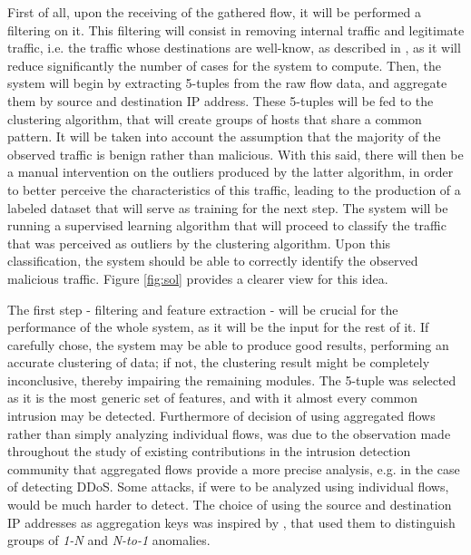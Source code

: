 \documentclass[runningheads,a4paper]{llncs}
\begin{document}
First of all, upon the receiving of the gathered flow, it will be performed a filtering on it. This filtering will consist in removing internal traffic and legitimate traffic, i.e. the traffic whose destinations are well-know, as described in \cite{Zeng2010}, as it will reduce significantly the number of cases for the system to compute. Then, the system will begin by extracting 5-tuples from the raw flow data, and aggregate them by source and destination IP address. These 5-tuples will be fed to the clustering algorithm, that will create groups of hosts that share a common pattern. It will be taken into account the assumption that the majority of the observed traffic is benign rather than malicious. With this said, there will then be a manual intervention on the outliers produced by the latter algorithm, in order to better perceive the characteristics of this traffic, leading to the production of a labeled dataset that will serve as training for the next step. The system will be running a supervised learning algorithm that will proceed to classify the traffic that was perceived as outliers by the clustering algorithm. Upon this classification, the system should be able to correctly identify the observed  malicious traffic. Figure \ref{fig:sol} provides a clearer view for this idea.


The first step - filtering and feature extraction - will be crucial for the performance of the whole system, as it will be the input for the rest of it. If carefully chose, the system may be able to produce good results, performing an accurate clustering of data; if not, the clustering result might be completely inconclusive, thereby impairing the remaining modules. The 5-tuple was selected as it is the most generic set of features, and with it almost every common intrusion may be detected. Furthermore of decision of using aggregated flows rather than simply analyzing individual flows, was due to the observation made throughout the study of existing contributions in the intrusion detection community \cite{Casas2012,schatzmann2011fact,Sadre2012,kim2004flow} that aggregated flows provide a more precise analysis, e.g. in the case of detecting DDoS. Some attacks, if were to be analyzed using individual flows, would be much harder to detect. The choice of using the source and destination IP addresses as aggregation keys was inspired by \cite{Casas2012}, that used them to distinguish groups of \textit{1-N} and \textit{N-to-1} anomalies. 
\end{document}
